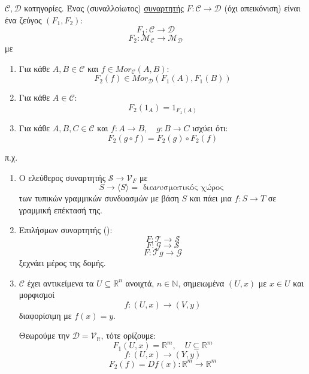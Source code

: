 \begin{defn} $\mathcal{C},\mathcal{D}$ κατηγορίες. Ένας (συναλλοίωτος) \underline{συναρτητής} $F : \mathcal{C} \rightarrow \mathcal{D}$ (όχι απεικόνιση) είναι ένα ζεύγος $(F_1, F_2):$
    $$F_1 : \mathcal{C} \longrightarrow \mathcal{D}$$
    $$F_2: \mathcal{M}_{\mathcal{C}} \longrightarrow \mathcal{M}_{\mathcal{D}}$$ με
    \begin{enumerate}
        \item Για κάθε $A,B \in \mathcal{C}$ και $f \in Mor_{\mathcal{C}}(A,B)$:
        $$F_2(f) \in Mor_{\mathcal{D}}(F_1(A),F_1(B))$$
        \item Για κάθε $A \in \mathcal{C}$:
        $$F_2(1_A) = 1_{F_1(A)}$$
        \item Για κάθε $A,B,C \in \mathcal{C}$ και $f :A \rightarrow B, \quad g: B \rightarrow C$ ισχύει ότι:
        $$F_2(g\circ f) = F_2(g) \circ F_2(f) $$
    \end{enumerate}
\end{defn}

π.χ.
\begin{enumerate}
    \item Ο ελεύθερος συναρτητής $\mathcal{S} \longrightarrow \mathcal{V}_{F}$ με
    $$S \longrightarrow \langle S \rangle = \text{ διανυσματικός χώρος }$$ των τυπικών γραμμικών συνδυασμών με βάση $S$ και πάει μια $f: S\rightarrow T$ σε γραμμική επέκτασή της.

    \item Επιλήσμων συναρτητής (): 
    $$F: \mathcal{T} \rightarrow \mathcal{S}$$
    $$F: \mathcal{G} \rightarrow \mathcal{S}$$
    $$F: \mathcal{T}g \rightarrow \mathcal{G}$$
    ξεχνάει μέρος της δομής.

    \item $\mathcal{C}$ έχει αντικείμενα τα $U \subseteq \mathbb{R}^n$ ανοιχτά, $n \in \mathbb{N}$, σημειωμένα $(U,x)$ με $x \in U$ και μορφισμοί
    $$f: (U,x) \rightarrow (V,y)$$ διαφορίσιμη με $f(x) = y$.

    Θεωρούμε την $\mathcal{D} = \mathcal{V}_{\mathbb{R}}$, τότε ορίζουμε:
    $$F_1 (U,x) = \mathbb{R}^m, \quad U \subseteq \mathbb{R}^m $$
    $$f: (U,x) \longrightarrow (Y,y)$$
    $$F_2 (f) = Df(x): \mathbb{R}^m \rightarrow \mathbb{R}^m$$
\end{enumerate}